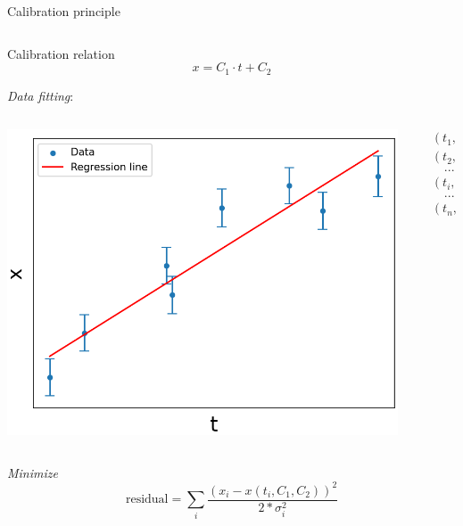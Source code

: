 \documentclass[compress, 13pt, aspectratio=169]{beamer}
\begin{document}
\begin{frame}[fragile,t]{Calibration principle}
	\vspace*{-2em}
	\begin{columns}[t]
		\begin{column}{0.45 \textwidth}
			\begin{block}{\small Calibration relation}
				$$x = C_1 \cdot t + C_2$$
			\end{block}
			\textit{\footnotesize Data fitting}:
			\begin{columns}
				\begin{column}{0.6 \textwidth}
					\includegraphics[keepaspectratio, height = 0.4\textheight]{fitting_plot.png}
				\end{column}
				\begin{column}{0.4 \textwidth}
					\small
					\vspace*{-1em}
					\begin{align*}
						 & (t_1,\  x_1) \\
						 & (t_2,\  x_2) \\
						 & \quad ...    \\
						 & (t_i,\  x_i) \\
						 & \quad ...    \\
						 & (t_n,\  x_n)
					\end{align*}
				\end{column}
			\end{columns}
			\vspace{0.3cm}
			\footnotesize{
				\textit{Minimize}
				$$ \text{residual}= \sum_i \frac{(x_i - x(t_i, C_1, C_2))^2}{ 2* \sigma_i^2} $$
}
\end{column}
\end{columns}
\end{frame}
\end{document}
